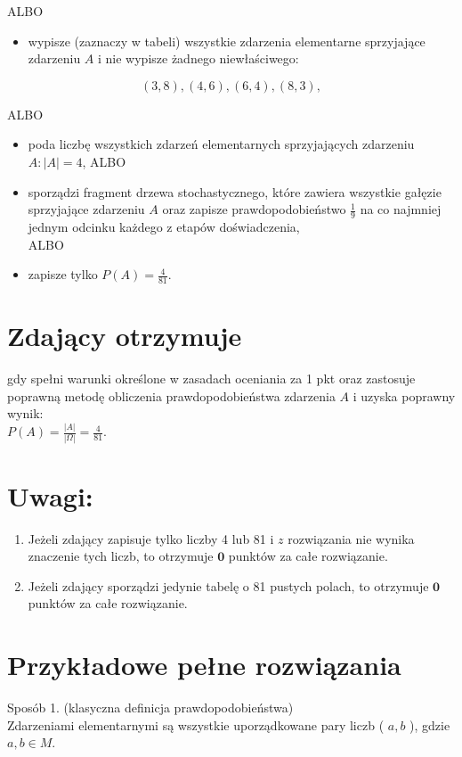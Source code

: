 \documentclass[10pt]{article}
\begin{document}
ALBO

\begin{itemize}
  \item wypisze (zaznaczy w tabeli) wszystkie zdarzenia elementarne sprzyjające zdarzeniu $A$ i nie wypisze żadnego niewłaściwego:
\end{itemize}

$$
(3,8),(4,6),(6,4),(8,3),
$$

ALBO

\begin{itemize}
  \item poda liczbę wszystkich zdarzeń elementarnych sprzyjających zdarzeniu $A:|A|=4$, ALBO
  \item sporządzi fragment drzewa stochastycznego, które zawiera wszystkie gałęzie sprzyjające zdarzeniu $A$ oraz zapisze prawdopodobieństwo $\frac{1}{9}$ na co najmniej jednym odcinku każdego z etapów doświadczenia,\\
ALBO
  \item zapisze tylko $P(A)=\frac{4}{81}$.
\end{itemize}

\section*{Zdający otrzymuje}
gdy spełni warunki określone w zasadach oceniania za 1 pkt oraz zastosuje poprawną metodę obliczenia prawdopodobieństwa zdarzenia $A$ i uzyska poprawny wynik:\\
$P(A)=\frac{|A|}{|\Omega|}=\frac{4}{81}$.

\section*{Uwagi:}
\begin{enumerate}
  \item Jeżeli zdający zapisuje tylko liczby 4 lub 81 i $z$ rozwiązania nie wynika znaczenie tych liczb, to otrzymuje $\mathbf{0}$ punktów za całe rozwiązanie.
  \item Jeżeli zdający sporządzi jedynie tabelę o 81 pustych polach, to otrzymuje $\mathbf{0}$ punktów za całe rozwiązanie.
\end{enumerate}

\section*{Przykładowe pełne rozwiązania}
Sposób 1. (klasyczna definicja prawdopodobieństwa)\\
Zdarzeniami elementarnymi są wszystkie uporządkowane pary liczb ( $a, b$ ), gdzie $a, b \in M$.
\end{document}
